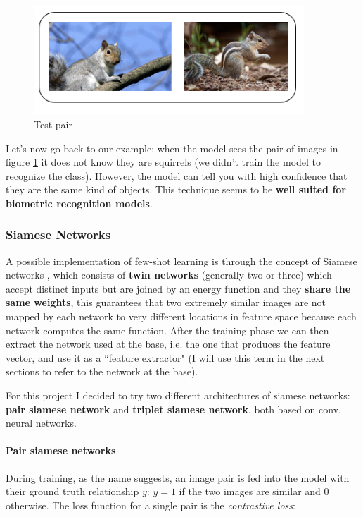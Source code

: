 \documentclass{article}
\begin{document}
\begin{figure}[H]
    \centering
    \includegraphics[width=4in]{imgs/squirrel.png}
    \caption{Test pair}
    \label{fig:exampleTP}
\end{figure}
Let's now go back to our example; when the model sees the pair of images in figure \ref{fig:exampleTP} it does not know they are squirrels (we didn't train the model to recognize the class). However, the model can tell you with high confidence that they are the same kind of objects. This technique seems to be \textbf{well suited for biometric recognition models}.

\subsubsection{Siamese Networks}
A possible implementation of few-shot learning is through the concept of Siamese networks \cite{koch2015siamese}, which consists of \textbf{twin networks} (generally two or three) which accept distinct inputs but are joined by an energy function and they \textbf{share the same weights}, this guarantees that two extremely similar images are not mapped by each network to very different locations in feature space because each network computes the same function. After the training phase we can then extract the network used at the base, i.e. the one that produces the feature vector, and use it as a ``feature extractor" (I will use this term in the next sections to refer to the network at the base).

\bigskip
For this project I decided to try two different architectures of siamese networks: \textbf{pair siamese network} and \textbf{triplet siamese network}, both based on conv. neural networks.

\paragraph{Pair siamese networks}

During training, as the name suggests, an image pair is fed into the model with their ground truth relationship $y$: $y = 1$ if the two images are similar and 0 otherwise. The loss function for a single pair is the \textit{contrastive loss}:
\end{document}
